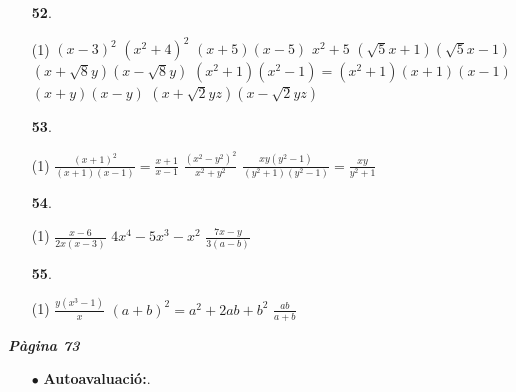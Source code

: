 \documentclass[a4paper, pdf, twoside]{book}
\begin{document}
\begin{multicols}{2}
\begin{enumerate}

 \item[\fontfamily{phv}\selectfont\color{blue}\textbf{52}. ] 
 \begin{tasks}[column-sep=1em, item-indent=1.3333em](1)
	 \task $(x-3)^2$
	 \task $(x^2+4)^2$
	 \task $(x+5)(x-5)$
	 \task $x^2+5$
	 \task $(\sqrt {5}x+1)(\sqrt {5}x-1)$
	 \task $(x+\sqrt {8}y)(x-\sqrt {8}y)$
	 \task $(x^2+1)(x^2-1)=(x^2+1)(x+1)(x-1)$
	 \task $(x+y)(x-y)$
	 \task $(x+\sqrt {2}yz)(x-\sqrt {2}yz)$
\end{tasks}
\vspace{0.25cm}



 \item[\fontfamily{phv}\selectfont\color{blue}\textbf{53}. ] 
 \begin{tasks}[column-sep=1em, item-indent=1.3333em](1)
	 \task* $\frac {(x+1)^2}{(x+1)(x-1)}=\frac {x+1}{x-1}$
	 \task $\frac {(x^2-y^2)^2}{x^2+y^2}$
	 \task* $\frac {xy(y^2-1)}{(y^2+1)(y^2-1)}=\frac {xy}{y^2+1}$
\end{tasks}
\vspace{0.25cm}



 \item[\fontfamily{phv}\selectfont\color{blue}\textbf{54}. ] 
 \begin{tasks}[column-sep=1em, item-indent=1.3333em](1)
	 \task $\frac {x-6}{2x(x-3)}$
	 \task $4x^4-5x^3-x^2$
	 \task $\frac {7x-y}{3(a-b)}$
\end{tasks}
\vspace{0.25cm}



 \item[\fontfamily{phv}\selectfont\color{blue}\textbf{55}. ] 
 \begin{tasks}[column-sep=1em, item-indent=1.3333em](1)
	 \task $\frac {y(x^3 -1)}{x}$
	 \task $(a+b)^2=a^2+2ab+b^2$
	 \task $\frac {ab}{a+b}$
\end{tasks}
 \end{enumerate}
\vspace{0.3cm}


{\textbf{\em Pàgina 73}} \hrulefill
\begin{enumerate}
\vspace{0.25cm}
 \item[$\bullet$ ] {\selectfont\color{blue}\textbf{Autoavaluació:}. }


\end{enumerate}
\end{multicols}
\end{document}
